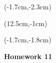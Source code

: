\documentclass[12pt, oneside]{article}
\begin{document}
\begin{textblock*}{4cm}(-1.7cm,-2.3cm)
\end{textblock*}

\begin{textblock*}{8cm}(12.5cm,-1cm)
\end{textblock*}
\begin{textblock*}{13.5cm}(-1.7cm,-1.8cm)
\end{textblock*}

\vspace{1cm}

\begin{center}
\textbf{\Large Homework 11}
\end{center}
\end{document}
